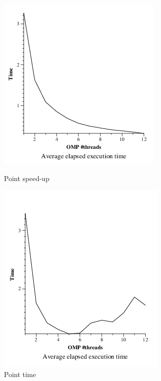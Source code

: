 \documentclass[a4paper]{article}
\begin{document}
\begin{figure}[H]
	\centering
	\begin{minipage}[b]{0.49\textwidth}
		\centering
		\includegraphics[width=\textwidth]{images/image10}
		\caption{Point speed-up}
	\end{minipage}
	\begin{minipage}[b]{0.49\textwidth}
		\centering
		\includegraphics[width=\textwidth]{images/image00}
		\caption{Point time}
	\end{minipage}
\end{figure}
\end{document}
